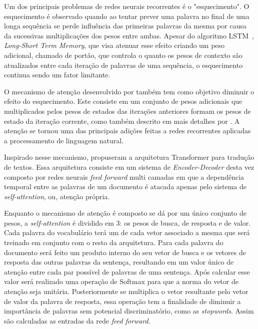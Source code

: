 Um dos principais problemas de redes neurais recorrentes é o "esquecimento".
O esquecimento é observado quando ao tentar prever uma palavra no final de uma
longa sequência se perde influência das primeiras palavras da mesma por causa da
sucessivas multiplicações dos pesos entre ambas.
Apesar do algoritmo LSTM~\cite{hochreiter97}, \textit{Long-Short Term Memory},
que visa atenuar esse efeito criando um peso adicional, chamado de portão, que
controla o quanto os pesos de contexto são atualizados entre cada iteração de
palavras de uma sequência, o esquecimento continua sendo um fator limitante.

O mecanismo de atenção desenvolvido por \citet{bahdanau14} também tem como
objetivo diminuir o efeito do esquecimento.
Este consiste em um conjunto de pesos adicionais que multiplicados pelos pesos
de estados das iterações anteriores formam os pesos de estado da iteração
corrente, como também descrito em mais detalhes por \citet{luong15}.
A atenção se tornou uma das principais adições feitas a redes recorrentes
aplicadas a processamento de linguagem natural.

Inspirado nesse mecanismo, \citet{vaswani17} propuseram a arquitetura
Transformer para tradução de textos.
Essa arquitetura consiste em um sistema de \textit{Encoder-Decoder} desta vez
composto por redes neurais \textit{feed forward} multi camadas em que a
dependência temporal entre as palavras de um documento é atacada apenas pelo
sistema de \textit{self-attention}, ou, atenção própria.

Enquanto o mecanismo de atenção é composto se dá por um único conjunto de pesos,
a \textit{self-attention} é dividido em 3: os pesos de busca, de resposta e de
valor.
Cada palavra do vocabulário terá um de cada vetor associado a mesma que será
treinado em conjunto com o resto da arquitetura.
Para cada palavra do documento será feito um produto interno do seu vetor de
busca e os vetores de resposta das outras palavras da sentença, resultando em um
valor único de atenção entre cada par possível de palavras de uma sentença.
Após calcular esse valor será realizado uma operação de Softmax para que a norma
do vetor de atenção seja unitária.
Posteriormente se multiplica o vetor resultante pelo vetor de valor da palavra
de resposta, essa operação tem a finalidade de diminuir a importância de
palavras sem potencial discriminatório, como as \textit{stopwords}.
Assim são calculadas as entradas da rede \textit{feed forward}.


